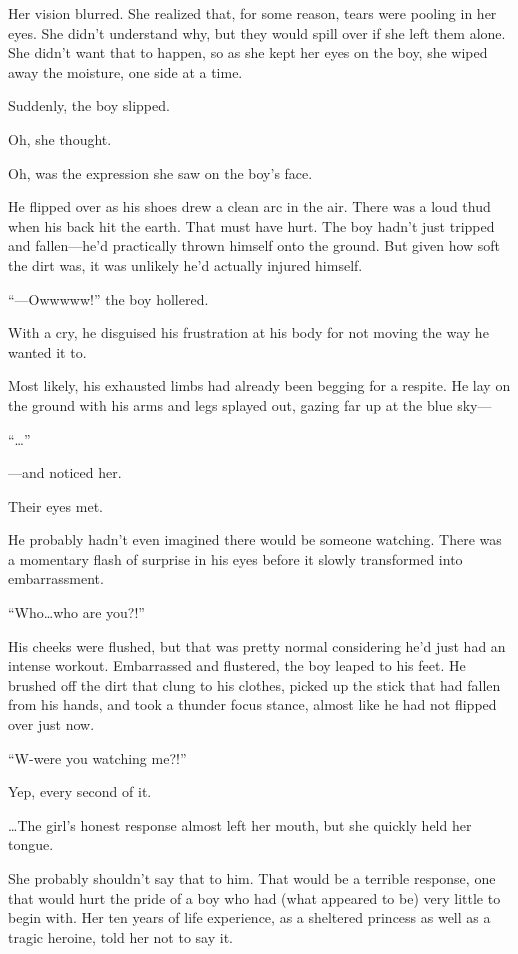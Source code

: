 Her vision blurred. She realized that, for some reason, tears were pooling in her eyes. She didn’t understand why, but they would spill over if she left them alone. She didn’t want that to happen, so as she kept her eyes on the boy, she wiped away the moisture, one side at a time.

Suddenly, the boy slipped.

Oh, she thought.

Oh, was the expression she saw on the boy’s face.

He flipped over as his shoes drew a clean arc in the air. There was a loud thud when his back hit the earth. That must have hurt. The boy hadn’t just tripped and fallen—he’d practically thrown himself onto the ground. But given how soft the dirt was, it was unlikely he’d actually injured himself.

“—Owwwww!” the boy hollered.

With a cry, he disguised his frustration at his body for not moving the way he wanted it to.

Most likely, his exhausted limbs had already been begging for a respite. He lay on the ground with his arms and legs splayed out, gazing far up at the blue sky—

“…”

—and noticed her.

Their eyes met.

He probably hadn’t even imagined there would be someone watching. There was a momentary flash of surprise in his eyes before it slowly transformed into embarrassment.

“Who…who are you?!”

His cheeks were flushed, but that was pretty normal considering he’d just had an intense workout. Embarrassed and flustered, the boy leaped to his feet. He brushed off the dirt that clung to his clothes, picked up the stick that had fallen from his hands, and took a thunder focus stance, almost like he had not flipped over just now.

“W-were you watching me?!”

Yep, every second of it.

…The girl’s honest response almost left her mouth, but she quickly held her tongue.

She probably shouldn’t say that to him. That would be a terrible response, one that would hurt the pride of a boy who had (what appeared to be) very little to begin with. Her ten years of life experience, as a sheltered princess as well as a tragic heroine, told her not to say it.


